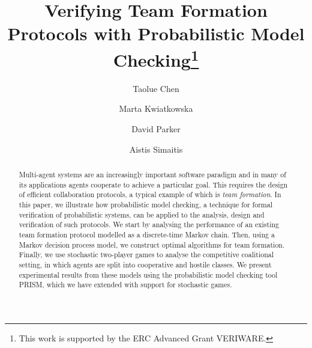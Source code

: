 \documentclass{llncs}
\newcommand{\aistis}[1]{\marginpar{\footnotesize \color{red} {\bf A:} \textsf{#1}}}
\begin{document}
\title{Verifying Team Formation Protocols with Probabilistic Model Checking\thanks{This work is supported by
the ERC Advanced Grant VERIWARE.}}

\author{Taolue Chen \and Marta Kwiatkowska \and David Parker \and Aistis Simaitis}

\maketitle
\aistis{Changed the title.}
\begin{abstract}
Multi-agent systems are an increasingly important software paradigm and in many of
its applications agents cooperate to achieve a particular goal.
This requires the design of efficient collaboration protocols,
a typical example of which is \emph{team formation}.
In this paper, we illustrate how probabilistic model checking,
a technique for formal verification of probabilistic systems,
can be applied to the analysis, design and verification of such protocols.
We start by analysing the performance of an existing team formation protocol
modelled as a discrete-time Markov chain.
Then, using a Markov decision process model,
we construct optimal algorithms for team formation.
Finally, we use stochastic two-player games to analyse the competitive coalitional setting,
in which agents are split into cooperative and hostile classes.
We present experimental results from these models
using the probabilistic model checking tool PRISM,
which we have extended with support for stochastic games.
\end{abstract}
\end{document}
